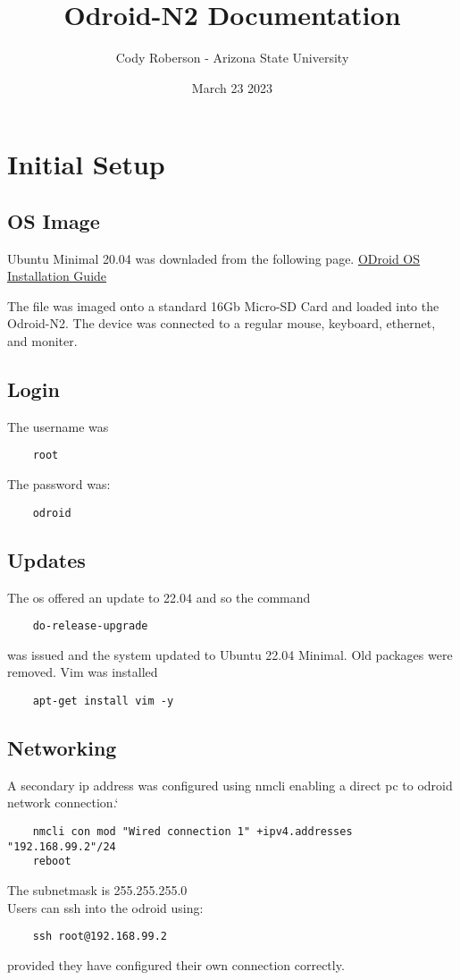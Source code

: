 \documentclass[11pt,letterpaper]{article}
\begin{document}
\date{March 23 2023}
\title{Odroid-N2 Documentation}
\author{Cody Roberson - Arizona State University}
\maketitle
\newpage
\tableofcontents
\newpage
\section{Initial Setup}
\subsection{OS Image}
Ubuntu Minimal 20.04 was downladed from the following page.
\href{https://wiki.odroid.com/getting_started/os_installation_guide#operating_systems_we_re_providing}{ODroid OS Installation Guide}

The file was imaged onto a standard 16Gb Micro-SD Card and loaded into the Odroid-N2.
The device was connected to a regular mouse, keyboard, ethernet, and moniter.

\subsection{Login}
The username was
\begin{verbatim}
    root
\end{verbatim}
The password was:
\begin{verbatim}
    odroid
\end{verbatim}
\subsection{Updates}
The os offered an update to 22.04 and so the command
\begin{verbatim}
    do-release-upgrade
\end{verbatim}
was issued and the system updated to Ubuntu 22.04 Minimal.
Old packages were removed.
Vim was installed
\begin{verbatim}
    apt-get install vim -y
\end{verbatim}
\subsection{Networking}
A secondary ip address was configured using nmcli enabling a direct pc to odroid
network connection.`
\begin{verbatim}
    nmcli con mod "Wired connection 1" +ipv4.addresses "192.168.99.2"/24
    reboot
\end{verbatim}
The subnetmask is 255.255.255.0\\
Users can ssh into the odroid using:
\begin{verbatim}
    ssh root@192.168.99.2
\end{verbatim}
provided they have configured their own connection correctly.
\end{document}
